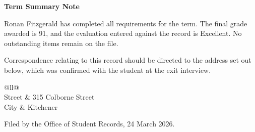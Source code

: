 \documentclass[11pt]{article}
\begin{document}
{\large\bfseries Term Summary Note}

\vspace{1.5em}

Ronan Fitzgerald has completed all requirements for the term. The final grade
awarded is 91, and the evaluation entered against the record is Excellent. No
outstanding items remain on the file.

Correspondence relating to this record should be directed to the address set out
below, which was confirmed with the student at the exit interview.

\vspace{1.5em}

\begin{center}
\begin{tabular}{@{}ll@{}}
\toprule
{} \\
\midrule
Street & 315 Colborne Street \\
City   & Kitchener \\
\bottomrule
\end{tabular}
\end{center}

\vspace{1.5em}

Filed by the Office of Student Records, 24 March 2026.
\end{document}
